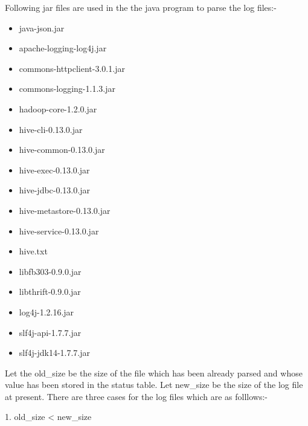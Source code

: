 \documentclass[a4paper,12pt,oneside]{sphinxmanual}
\begin{document}
Following jar files are used in the the java program to parse the log files:-
\begin{itemize}
\item {} 
java-json.jar

\item {} 
apache-logging-log4j.jar

\item {} 
commons-httpclient-3.0.1.jar

\item {} 
commons-logging-1.1.3.jar

\item {} 
hadoop-core-1.2.0.jar

\item {} 
hive-cli-0.13.0.jar

\item {} 
hive-common-0.13.0.jar

\item {} 
hive-exec-0.13.0.jar

\item {} 
hive-jdbc-0.13.0.jar

\item {} 
hive-metastore-0.13.0.jar

\item {} 
hive-service-0.13.0.jar

\item {} 
hive.txt

\item {} 
libfb303-0.9.0.jar

\item {} 
libthrift-0.9.0.jar

\item {} 
log4j-1.2.16.jar

\item {} 
slf4j-api-1.7.7.jar

\item {} 
slf4j-jdk14-1.7.7.jar

\end{itemize}

Let the old\_size be the size of the file which has been already parsed and whose value has been stored in the status table. Let new\_size be the size of the log file at present.
There are three cases for the log files which are as folllows:-

\begin{DUlineblock}{0em}
\item[] 1. old\_size \textless{} new\_size
\end{DUlineblock}
\end{document}

